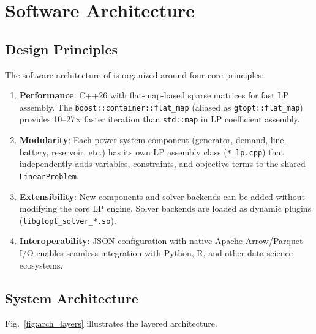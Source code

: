 
\section{Software Architecture}
\label{sec:architecture}

\subsection{Design Principles}

The software architecture of \gtopt{} is organized around four core
principles:

\begin{enumerate}
  \item \textbf{Performance}: C++26 with flat-map-based sparse matrices
    for fast LP assembly.  The \texttt{boost::container::flat\_map}
    (aliased as \texttt{gtopt::flat\_map}) provides 10--27$\times$ faster
    iteration than \texttt{std::map} in LP coefficient assembly.
  \item \textbf{Modularity}: Each power system component (generator,
    demand, line, battery, reservoir, etc.) has its own LP assembly class
    (\texttt{*\_lp.cpp}) that independently adds variables, constraints,
    and objective terms to the shared \texttt{LinearProblem}.
  \item \textbf{Extensibility}: New components and solver backends can be
    added without modifying the core LP engine.  Solver backends are
    loaded as dynamic plugins (\texttt{libgtopt\_solver\_*.so}).
  \item \textbf{Interoperability}: JSON configuration with native Apache
    Arrow/Parquet I/O enables seamless integration with Python, R, and
    other data science ecosystems.
\end{enumerate}

\subsection{System Architecture}

Fig.~\ref{fig:arch_layers} illustrates the layered architecture.


